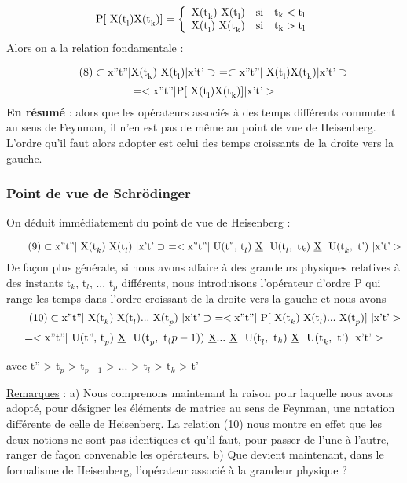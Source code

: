 \[
\text{P}[\text{ X(t}_{\text{l}}) \text{X(t}_{\text{k}})] = 
\left\{
  \begin{array}{rcr}
    \text{X(t}_{\text{k}}) \text{ X(t}_{\text{l}}) & \text{si} & \text{t}_{\text{k}} < \text{t}_{\text{l}} \\
    \text{X(t}_{\text{l}}) \text{ X(t}_{\text{k}}) & \text{si} & \text{t}_{\text{k}} > \text{t}_{\text{l}} \\
  \end{array}
\right.\]
Alors on a la relation fondamentale :

\[
\tag{8}\subset \text{x''t''} | \text{X(t}_{\text{k}}) \text{ X(t}_{\text{l}}) | \text{x't'}\supset\ =
\subset \text{x''t''} | \text{ X(t}_{\text{l}}) \text{X(t}_{\text{k}}) | \text{x't'}\supset\
\]
\[
 = < \text{x''t''} | \text{P}[\text{ X(t}_{\text{l}}) \text{X(t}_{\text{k}})] | \text{x't'} >
\]
{\bf En résumé} : alors que les opérateurs associés à des temps différents commutent au sens de Feynman, il n'en est pas de même au point de vue de Heisenberg.
L'ordre qu'il faut alors adopter est celui des temps croissants de la droite
vers la gauche.
\subsubsection{Point de vue de Schrödinger}%
On déduit immédiatement du point de vue de Heisenberg :

\[
\tag{9}\subset \text{x''t''} | \text{ X(t}_k) \text{ X(t}_l)\ | \text{x't'}\supset\ =
< \text{x''t''}|\text{ U(t'', t}_l)
\ \underline{\text{X}}\ \text{ U(t}_l,\text{ t}_k)
\ \underline{\text{X}}\ \text{ U(t}_k,\text{ t') }|\text{x't'} >
\]
De façon plus générale, si nous avons affaire à des grandeurs physiques
relatives à des instants t$_k$, t$_l$, ... t$_p$ différents, nous introduisons
l'opérateur d'ordre P qui range les temps dans l'ordre croissant de la
droite vers la gauche et nous avons
\[
\tag{10}\subset \text{x''t''} | \text{ X(t}_k) \text{ X(t}_l)... \text{ X(t}_p)\ | \text{x't'}\supset\ =
< \text{x''t''}|\text{ P}[\text{ X(t}_k) \text{ X(t}_l)... \text{ X(t}_p)]
\ |\text{x't'} >
\]
\[=
< \text{x''t''}|\text{ U(t'', t}_p)
\ \underline{\text{X}}\ \text{ U(t}_p,\text{ t}_(p-1))
\ \underline{\text{X}}...
\ \underline{\text{X}}\ \text{ U(t}_l,\text{ t}_k)
\ \underline{\text{X}}\ \text{ U(t}_k,\text{ t') }|\text{x't'} >
\]
\begin{center}
avec t'' > t$_p$ > t$_{p-1}$ > ... > t$_l$ > t$_k$ > t'
\end{center}

\ul{Remarques} :
a) Nous comprenons maintenant la raison pour laquelle nous avons adopté,
pour désigner les éléments de matrice au sens de Feynman, une notation différente de celle de Heisenberg. La relation (10) nous montre en effet que
les deux notions ne sont pas identiques et qu'il faut, pour passer de l'une
à l'autre, ranger de façon convenable les opérateurs.
b) Que devient maintenant, dans le formalisme de Heisenberg, l'opérateur
associé à la grandeur physique ?

